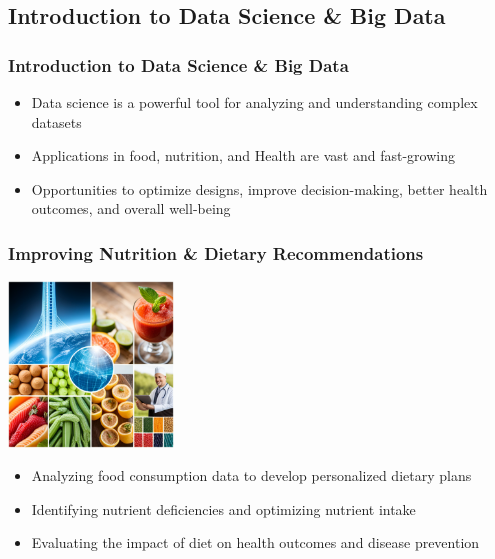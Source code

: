 \documentclass{beamer}
\begin{document}
    \subsection{Introduction to Data Science \& Big Data} 
    \begin{frame}
        \frametitle{Introduction to Data Science \& Big Data}
        \begin{itemize}
            \item Data science is a powerful tool for analyzing and understanding complex datasets
            \item Applications in food, nutrition, and Health are vast and fast-growing
            \item Opportunities to optimize designs, improve decision-making, better health outcomes, and overall well-being
        \end{itemize}
    \end{frame}
        
    \begin{frame}
        \frametitle{Improving Nutrition \& Dietary Recommendations}
        \begin{center}
            \includegraphics[width=0.33\textwidth]{figures/nutrition-data-science}
        \end{center}
        \begin{itemize}
            \item Analyzing food consumption data to develop personalized dietary plans
            \item Identifying nutrient deficiencies and optimizing nutrient intake
            \item Evaluating the impact of diet on health outcomes and disease prevention
        \end{itemize}
    \end{frame}
        
\end{document}
